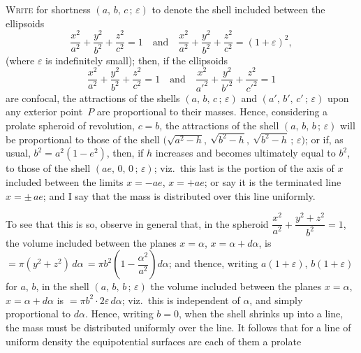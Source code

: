 \documentclass[11pt,a4paper]{article}
\theoremstyle{plain}
\theoremstyle{definition}
\begin{document}
\textsc{Write} for shortness $(a,\,b,\,c\,;\,\varepsilon)$ to denote the shell included between the ellipsoids
\[
\frac{x^2}{a^2} + \frac{y^2}{b^2} + \frac{z^2}{c^2} = 1
\quad\text{and}\quad
\frac{x^2}{a^2} + \frac{y^2}{b^2} + \frac{z^2}{c^2} = (1+\varepsilon)^2,
\]
(where $\varepsilon$ is indefinitely small); then, if the ellipsoids
\[
\frac{x^2}{a^2} + \frac{y^2}{b^2} + \frac{z^2}{c^2} = 1
\quad\text{and}\quad
\frac{x^2}{a'^2} + \frac{y^2}{b'^2} + \frac{z^2}{c'^2} = 1
\]
are confocal, the attractions of the shells $(a,\,b,\,c\,;\,\varepsilon)$ and $(a',\,b',\,c'\,;\,\varepsilon)$ upon any exterior
point~$P$ are proportional to their masses.  Hence, considering a prolate spheroid of
revolution, $c=b$, the attractions of the shell $(a,\,b,\,b\,;\,\varepsilon)$ will be proportional to those
of the shell $\bigl(\sqrt{a^2-h},\ \sqrt{b^2-h},\ \sqrt{b^2-h}\,;\,\varepsilon\bigr)$; or if, as usual, $b^2 = a^2(1-e^2)$, then, if $h$ increases
and becomes ultimately equal to $b^2$, to those of the shell $(ae,\,0,\,0\,;\,\varepsilon)$; viz.\ this last
is the portion of the axis of $x$ included between the limits $x = -ae$, $x = +ae$; or say
it is the terminated line $x = \pm\, ae$; and I say that the mass is distributed over this line
uniformly.

To see that this is so, observe in general that, in the spheroid
$\dfrac{x^2}{a^2} + \dfrac{y^2 + z^2}{b^2} = 1$, the
volume included between the planes $x = \alpha$, $x = \alpha + d\alpha$, is
$= \pi(y^2 + z^2)\,d\alpha\, = \pi b^2\!\left(1 - \dfrac{\alpha^2}{a^2}\right) d\alpha$;
and thence, writing $a(1+\varepsilon)$, $b(1+\varepsilon)$ for $a$, $b$, in the shell $(a,\,b,\,b\,;\,\varepsilon)$ the volume
included between the planes $x=\alpha$, $x = \alpha + d\alpha$ is $= \pi b^2 \cdot 2\varepsilon\, d\alpha$; viz.\ this is independent
of $\alpha$, and simply proportional to $d\alpha$.  Hence, writing $b = 0$, when the shell shrinks
up into a line, the mass must be distributed uniformly over the line.  It follows that
for a line of uniform density the equipotential surfaces are each of them a prolate

\clearpage
\end{document}
